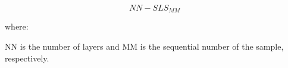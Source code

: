 \documentclass{article}
\begin{document}
        \begin{equation}
            NN-SLS_{MM}
            \label{eq:SLS_specimen_notation}
        \end{equation}

        where: 

        NN is the number of layers and MM is the sequential number of the sample, respectively. \\ 

    \begin{table}[h!]
        \centering
    \caption{A list of the most relevant 3D printed specimens}
    \label{tab:SLS_samples}
    \end{table}
\end{document}
